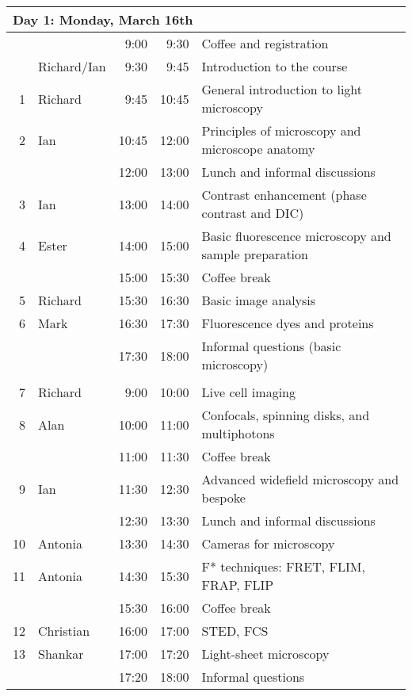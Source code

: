 \documentclass[10pt,a4paper]{memoir}
\begin{document}
  \begin{tabular}{r l r@{ -- }r l}
    \multicolumn{5}{l}{Day 1: Monday, March 16th} \\

    \toprule
    \null & \null     &  9:00 &  9:30 & Coffee and registration \\
    \null & Richard/Ian &  9:30 &  9:45 & Introduction to the course \\
    1     & Richard   &  9:45 & 10:45 & General introduction to light microscopy \\
    2     & Ian       & 10:45 & 12:00 & Principles of microscopy and microscope anatomy \\
    \null & \null     & 12:00 & 13:00 & Lunch and informal discussions \\
    3     & Ian       & 13:00 & 14:00 & Contrast enhancement (phase contrast and DIC) \\
    4     & Ester     & 14:00 & 15:00 & Basic fluorescence microscopy and sample preparation \\
    \null & \null     & 15:00 & 15:30 & Coffee break \\
    5     & Richard   & 15:30 & 16:30 & Basic image analysis \\
    6     & Mark      & 16:30 & 17:30 & Fluorescence dyes and proteins \\
    \null & \null     & 17:30 & 18:00 & Informal questions (basic microscopy) \\

    \addlinespace
    \multicolumn{5}{l}{Day 2: Tuesday, March 17th} \\

    \toprule
    7     & Richard   &  9:00 & 10:00 & Live cell imaging \\
    8     & Alan      & 10:00 & 11:00 & Confocals, spinning disks, and multiphotons \\
    \null & \null     & 11:00 & 11:30 & Coffee break \\
    9     & Ian       & 11:30 & 12:30 & Advanced widefield microscopy and bespoke \\
    \null & \null     & 12:30 & 13:30 & Lunch and informal discussions \\
    10    & Antonia   & 13:30 & 14:30 & Cameras for microscopy \\
    11    & Antonia   & 14:30 & 15:30 & F* techniques: FRET, FLIM, FRAP, FLIP \\
    \null & \null     & 15:30 & 16:00 & Coffee break \\
    12    & Christian & 16:00 & 17:00 & STED, FCS \\
    13    & Shankar   & 17:00 & 17:20 & Light-sheet microscopy \\
    \null & \null     & 17:20 & 18:00 & Informal questions \\


\end{tabular}
\end{document}
